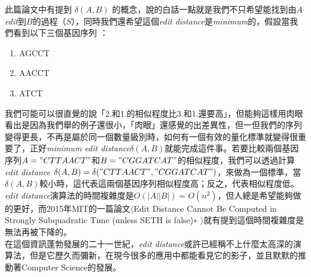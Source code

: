 \documentclass[15pt]{extarticle}
\begin{document}
此篇論文中有提到 $\delta(A,B)$ 的概念，說的白話一點就是我們不只希望能找到由$A$ \textit{edit}到$B$的過程（$S$），同時我們還希望這個\textit{edit distance}是\textit{minimum}的，假設當我們看到以下三個基因序列 ：

\begin{enumerate}
    \item AGCCT
    \item AACCT
    \item ATCT
\end{enumerate}

我們可能可以很直覺的說「2.和1.的相似程度比3.和1.還要高」，但能夠這樣用肉眼看出是因為我們舉的例子還很小，「肉眼」還感覺的出差異性，但一但我們的序列變得更長，不再是屬於同一個數量級別時，如何有一個有效的量化標準就變得很重要了，正好\textit{minimum edit distance}$\delta(A,B)$就能完成這件事。若要比較兩個基因序列$A="CTTAACT"
$和$B="CGGATCAT"$的相似程度，我們可以透過計算\textit{edit distance} $\delta(A,B)=\delta("CTTAACT","CGGATCAT")$，來做為一個標準，當$\delta(A,B)$較小時，這代表這兩個基因序列相似程度高；反之，代表相似程度低。\\

\textit{edit distance}演算法的時間複雜度是$O(|A||B|)=O(n^2)$，但人總是希望能夠做的更好，而2015年MIT的一篇論文$\langle$Edit Distance Cannot Be Computed in Strongly Subquadratic Time
(unless SETH is false)∗ $\rangle$就有提到這個時間複雜度是無法再被下降的。\\

在這個資訊蓬勃發展的二十一世紀，\textit{edit distance}或許已經稱不上什麼太高深的演算法，但是它歷久而彌新，在現今很多的應用中都能看見它的影子，並且默默的推動著Computer Science的發展。
\end{document}
